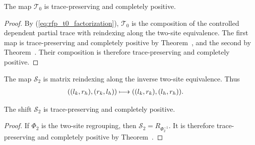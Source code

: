 \begin{lemma}
    \label{thm:mpdo_t0_map_cptp}
    \leanok
    The map $\mathcal T_0$ is trace-preserving and completely positive.
\end{lemma}
\begin{proof}
    \leanok

    By (\ref{eq:rfp_t0_factorization}), $\mathcal T_0$ is the composition of
    the controlled dependent partial trace with reindexing along the two-site
    equivalence. The first map is trace-preserving and completely positive by
    Theorem~\cite[``The controlled dependent partial trace is trace-preserving completely positive'']{QICLean2026Blueprint}, and the
    second by Theorem~\cite[``Equivalence reindexing is trace-preserving completely positive'']{QICLean2026Blueprint}. Their composition is
    therefore trace-preserving and completely positive.
\end{proof}

\begin{definition}
    \label{def:mpdo_s2_map}
    \leanok
    The map $\mathcal S_2$ is matrix reindexing along the inverse two-site
    equivalence. Thus
    \begin{align}
        ((l_k,r_h),(r_k,l_h))
         & \longmapsto ((l_k,r_k),(l_h,r_h)). \notag
    \end{align}
\end{definition}

\begin{lemma}
    \label{thm:mpdo_s2_map_cptp}
    \leanok
    The shift $\mathcal S_2$ is trace-preserving and completely positive.
\end{lemma}
\begin{proof}
    \leanok

    If $\Phi_2$ is the two-site regrouping, then
    $\mathcal S_2=R_{\Phi_2^{-1}}$. It is therefore trace-preserving and
    completely positive by Theorem~\cite[``Equivalence reindexing is trace-preserving completely positive'']{QICLean2026Blueprint}.
\end{proof}

